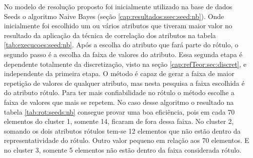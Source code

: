 No modelo de resolução proposto foi inicialmente utilizado na base de dados Seeds o algoritmo Naive Bayes (seção \ref{cap:resultados:ssec:seed:nb}). Onde inicialmente foi escolhido um ou vários atributos que tiveram maior valor no resultado da aplicação da técnica de correlação dos atributos na tabela  \ref{tab:execucoes:seed:nb}. Após a escolha do atributo que fará parte do rótulo, o segundo passo é a escolha da faixa de valores do atributo. Essa segunda etapa é dependente totalmente da discretização, visto na seção \ref{cap:refTeor:sec:discret}, e independente da primeira etapa. O método é capaz de gerar a faixa de maior repetição de valores de qualquer atributo, mas nesta pesquisa  a faixa escolhida é do atributo rótulo. Para ter mais  confiabilidade  no rótulo o método escolhe a faixa de valores que mais se repetem. No caso desse algoritmo o resultado na tabela \ref{tab:rot:seeds:nb} consegue provar uma boa eficiência, pois em cada 70 elementos do cluster 1, somente 14, ficaram de fora dessa faixa. No cluster 2, somando os dois atributos rótulos tem-se 12 elementos que não estão dentro da representatividade do rótulo. Outro valor pequeno em relação aos 70 elementos. E no cluster 3, somente 5 elementos não estão dentro da faixa considerada rótulo.


